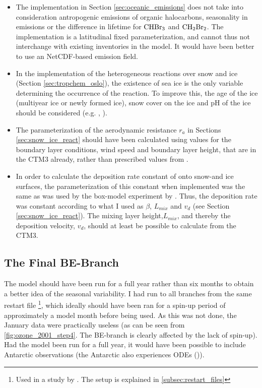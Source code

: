 \begin{itemize}
    \item The implementation in Section \ref{sec:oceanic_emissions} does not take into consideration antropogenic emissions of organic halocarbons, seasonality in emissions or the difference in lifetime for $\mathrm{CHBr_3}$ and $\mathrm{CH_2Br_2}$. The implementation is a latitudinal fixed parameterization, and cannot thus not interchange with existing inventories in the model. It would have been better to use an NetCDF-based emission field. 
    \item In the implementation of the heterogeneous reactions over snow and ice (Section \ref{sec:tropchem_oslo}), the existence of sea ice is the only variable determining the occurrence of the reaction. To improve this, the age of the ice (multiyear ice or newly formed ice), snow cover on the ice and pH of the ice should be considered (e.g. \cite{Thomas2011}, \cite{Peterson2019}).
    \item The parameterization of the aerodynamic resistance $r_a$ in Sections \ref{sec:snow_ice_react} should have been calculated using values for the boundary layer conditions, wind speed and boundary layer height, that are in the CTM3 already, rather than prescribed values from \cite{CAO}. 
    \item In order to calculate the deposition rate constant of  onto snow-and ice surfaces, the parameterization of this constant when implemented was the same as was used by the box-model experiment by \cite{CAO}. Thus, the deposition rate was constant according to what I used as $\beta$, $L_{mix}$ and $v_d$ (see Section \ref{sec:snow_ice_react}). The mixing layer height,$L_{mix}$, and thereby the deposition velocity, $v_d$, should at least be possible to calculate from the CTM3. 
\end{itemize}


\subsection{The Final BE-Branch}


The model should have been run for a full year rather than six months to obtain a better idea of the seasonal variability. I had run to all branches from the same restart file \footnote{Used in a study by \cite{Falk_2019}. The setup is explained in \ref{subsec:restart_files}}, which ideally should have been ran for a spin-up period of approximately a model month before being used. As this was not done, the January data were practically useless (as can be seen from \ref{fig:ozone_2001_step4}. The BE-branch is clearly affected by the lack of spin-up). Had the model been run for a full year, it would have been possible to include Antarctic observations (the Antarctic also experiences ODEs (\cite{Simpson2015})).

